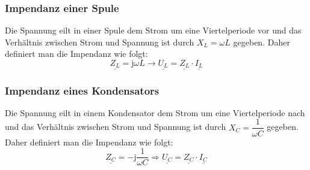 \subsubsection{Impendanz einer Spule}
Die Spannung eilt in einer Spule dem Strom um eine Viertelperiode vor und das Verhältnis zwischen Strom und Spannung ist durch $X_L=\omega L$ gegeben. Daher definiert man die Impendanz wie folgt:
\begin{equation}
\boxed{\underline{Z_L}=\text{j}\omega L\longrightarrow \underline{U_L}=\underline{Z_L}\cdot \underline{I_L}}
\end{equation}
\subsubsection{Impendanz eines Kondensators}
Die Spannung eilt in einem Kondensator dem Strom um eine Viertelperiode nach und das Verhältnis zwischen Strom und Spannung ist durch $X_C=\dfrac{1}{\omega C}$ gegeben. Daher definiert man die Impendanz wie folgt:
\begin{equation}
\boxed{\underline{Z_C}=-\text{j}\dfrac{1}{\omega C}\Longrightarrow \underline{U_C}=\underline{Z_C}\cdot \underline{I_C}}
\end{equation}

